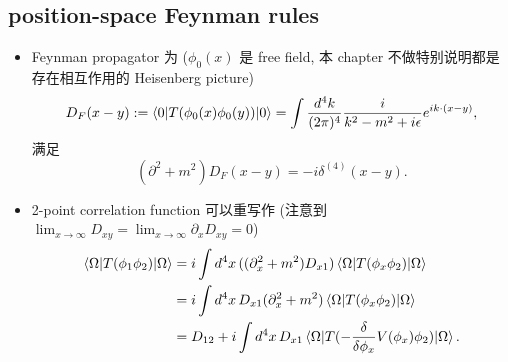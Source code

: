 \subsection{position-space Feynman rules}
\begin{itemize}
	\item Feynman propagator 为 ($\phi_0(x)$ 是 free field, 本 chapter 不做特别说明都是存在相互作用的 Heisenberg picture)
	\begin{equation}
		D_F(x - y) := \braket{0 | T(\phi_0(x) \phi_0(y)) | 0} = \int \frac{d^4 k}{(2 \pi)^4} \frac{i}{k^2 - m^2 + i \epsilon} e^{i k \cdot (x - y)},
	\end{equation}
	满足
	\begin{equation}
		(\partial^2 + m^2) D_F(x - y) = - i \delta^{(4)}(x - y).
	\end{equation}
	
	\item 2-point correlation function 可以重写作 (注意到 $\lim_{x \rightarrow \infty} D_{x y} = \lim_{x \rightarrow \infty} \partial_x D_{x y} = 0$)
	\begin{align}
		\braket{\Omega | T(\phi_1 \phi_2) | \Omega} &= i \int d^4 x \, ((\partial_x^2 + m^2) D_{x 1}) \braket{\Omega | T(\phi_x \phi_2) | \Omega} \notag \\
		&= i \int d^4 x \, D_{x 1} (\partial_x^2 + m^2) \braket{\Omega | T(\phi_x \phi_2) | \Omega} \notag \\
		&= D_{1 2} + i \int d^4 x \, D_{x 1} \braket{\Omega | T(- \frac{\delta}{\delta \phi_x} V(\phi_x) \phi_2) | \Omega}.
	\end{align}
\end{itemize}

